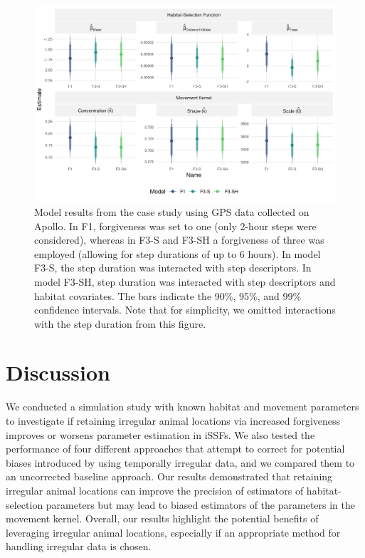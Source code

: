 \documentclass[abstract=on,10pt,a4paper,bibliography=totocnumbered]{article}
\begin{document}
\begin{figure}
  \begin{center}
  \includegraphics[width = \textwidth]{99_CaseStudy.png}
  \caption{Model results from the case study using GPS data collected on Apollo.
  In F1, forgiveness was set to one (only 2-hour steps were considered), whereas
  in F3-S and F3-SH a forgiveness of three was employed (allowing for step
  durations of up to 6 hours). In model F3-S, the step duration was interacted
  with step descriptors. In model F3-SH, step duration was interacted with step
  descriptors and habitat covariates. The bars indicate the 90\%, 95\%, and 99\%
  confidence intervals. Note that for simplicity, we omitted interactions with
  the step duration from this figure.}
  \label{CaseStudy}
  \end{center}
\end{figure}

\section{Discussion}

We conducted a simulation study with known habitat and movement parameters to
investigate if retaining irregular animal locations via increased forgiveness
improves or worsens parameter estimation in iSSFs. We also tested the
performance of four different approaches that attempt to correct for potential
biases introduced by using temporally irregular data, and we compared them to an
uncorrected baseline approach. Our results demonstrated that retaining irregular
animal locations can improve the precision of estimators of habitat-selection
parameters but may lead to biased estimators of the parameters in
the movement kernel. Overall, our results highlight the potential benefits of
leveraging irregular animal locations, especially if an appropriate method for
handling irregular data is chosen.
\end{document}
